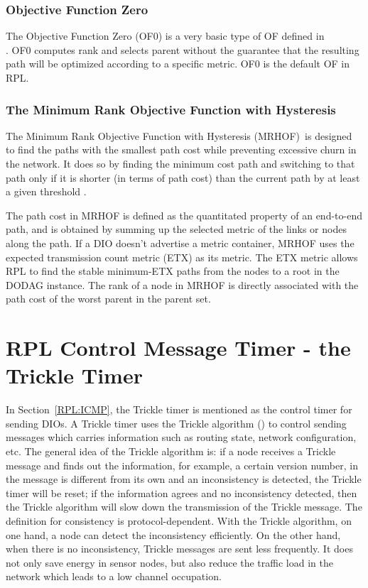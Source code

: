 \subsubsection{Objective Function Zero}
\label{RPL:OF0}
The Objective Function Zero (OF0) is a very basic type of OF defined in \\ \cite{draft-ietf-roll-of0-19}. OF0 computes rank and selects parent without the guarantee that the resulting path will be optimized according to a specific metric. OF0 is the default OF in RPL.
 
\subsubsection{The Minimum Rank Objective Function with Hysteresis}
\label{RPL:MRHOF}
The Minimum Rank Objective Function with Hysteresis (MRHOF)\, is designed to find the paths with the smallest path cost while preventing excessive churn in the network. It does so by finding the minimum cost path and switching to that path only if it is shorter (in terms of path cost) than the current path by at least a given threshold \cite{MRHOF}. 
\newline

The path cost in MRHOF is defined as the quantitated property of an end-to-end path, and is obtained by summing up the selected metric of the links or nodes along the path. If a DIO doesn't advertise a metric container, MRHOF uses the expected transmission count metric (ETX) as its metric. The ETX metric allows RPL to find the stable minimum-ETX paths from the nodes to a root in the DODAG instance. The rank of a node in MRHOF is directly associated with the path cost of the worst parent in the parent set.

\section{RPL Control Message Timer - the Trickle Timer}
\label{Trickle}
In Section~\ref{RPL:ICMP}, the Trickle timer is mentioned as the control timer for sending DIOs. A Trickle timer uses the Trickle algorithm (\cite{RFC 6206}) to control sending messages which carries information such as routing state, network configuration, etc. The general idea of the Trickle algorithm is: if a node receives a Trickle message and finds out the information, for example, a certain version number, in the message is different from its own and an inconsistency is detected, the Trickle timer will be reset; if the information agrees and no inconsistency detected, then the Trickle algorithm will slow down the transmission of the Trickle message. The definition for consistency is protocol-dependent. With the Trickle algorithm, on one hand, a node can detect the inconsistency efficiently. On the other hand, when there is no inconsistency, Trickle messages are sent less frequently. It does not only save energy in sensor nodes, but also reduce the traffic load in the network which leads to a low channel occupation. 
\newline

